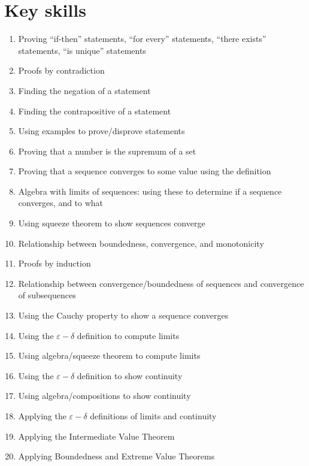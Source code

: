 \documentclass[12pt]{amsart}
\newcommand{\e}{\varepsilon}
\renewcommand{\d}{\delta}
\begin{document}
\section*{Key skills}

\begin{enumerate}
	\item Proving ``if-then'' statements, ``for every'' statements, ``there exists'' statements, ``is unique'' statements
	\item Proofs by contradiction
	\item Finding the negation of a statement
	\item Finding the contrapositive of a statement
	\item Using examples to prove/disprove statements
	\item Proving that a number is the supremum of a set

	\item Proving that a sequence converges to some value using the definition
		\item Algebra with limits of sequences: using these to determine if a sequence converges, and to what
	\item Using squeeze theorem to show sequences converge


	\item Relationship between boundedness, convergence, and monotonicity
		\item Proofs by induction

	\item Relationship between convergence/boundedness of sequences and convergence of subsequences
	\item Using the Cauchy property to show a sequence converges

	\item Using the $\e-\d$ definition to compute limits
						
	\item Using algebra/squeeze theorem to compute limits

	\item Using the $\e-\d$ definition to show continuity

	\item Using algebra/compositions to show continuity
	\item Applying the $\e-\d$ definitions of limits and continuity 
			\item Applying the Intermediate Value Theorem
		\item Applying Boundedness and Extreme Value Theorems
			\begin{comment}

	\item Evaluating derivatives by definition
	\item Evaluating derivatives by algebra and chain rule
	\item Using definition of derivative and Min-Max Theorem to determine when values of $f$ are larger / smaller than others
	\item Using definition of derivative and mean value theorem to determine increasing / decreasing behavior of functions
\end{comment}
\end{enumerate}
\end{document}
